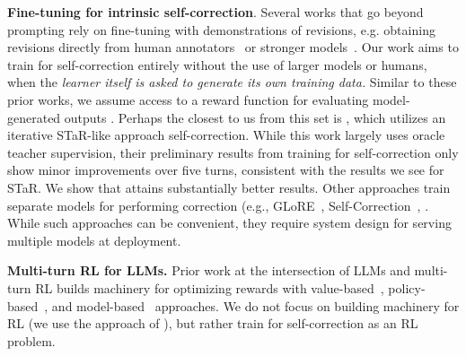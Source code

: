 \textbf{Fine-tuning for intrinsic self-correction}. Several works that go beyond prompting rely on fine-tuning with demonstrations of revisions, e.g. obtaining revisions directly from human annotators~\citep{saunders2022self} or stronger models~\citep{ye2023selfee, qu2024recursive}. Our work aims to train for self-correction entirely without the use of larger models or humans, when the \emph{learner itself is asked to generate its own training data.} Similar to these prior works, we assume access to a reward function for evaluating model-generated outputs  \citep{welleck2023generating, akyurek2023rl4f, zhang2024small}. Perhaps the closest to us from this set is \citet{qu2024recursive}, which utilizes an iterative STaR-like approach self-correction. While this work largely uses oracle teacher supervision, their preliminary results from training for self-correction only show minor improvements over five turns, consistent with the results we see for STaR. We show that \methodname{} attains substantially better results. Other approaches train separate models for performing correction (e.g., GLoRE~\citep{havrilla2024glore}, Self-Correction~\citep{welleck2023generating}, \citet{akyurek2023rl4f, paul2023refiner}. While such approaches can be convenient, they require system design for serving multiple models at deployment.

\textbf{Multi-turn RL for LLMs.} Prior work at the intersection of LLMs and multi-turn RL builds machinery for optimizing rewards with value-based~\citep{snell2022offline,zhou2024archer, farebrother2024stop, shani2024multi}, policy-based~\citep{xiong2024building, shao2024deepseekmath}, and model-based~\citep{hong2024reference} approaches. We do not focus on building machinery for RL (we use the approach of \citet{ahmadian2024back}), but rather train for self-correction as an RL problem. 


